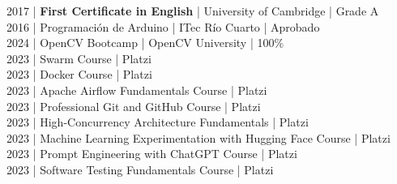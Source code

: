 {%
2017 | \textbf{First Certificate in English} | University of Cambridge | Grade A \\
2016 | Programación de Arduino | ITec Río Cuarto | Aprobado \\
}{
2024 | OpenCV Bootcamp | OpenCV University | 100\% \\
2023 | Swarm Course | Platzi \\
2023 | Docker Course | Platzi \\
2023 | Apache Airflow Fundamentals Course | Platzi \\
2023 | Professional Git and GitHub Course | Platzi \\
2023 | High-Concurrency Architecture Fundamentals | Platzi \\
2023 | Machine Learning Experimentation with Hugging Face Course | Platzi \\
2023 | Prompt Engineering with ChatGPT Course | Platzi \\
2023 | Software Testing Fundamentals Course | Platzi \\
}
